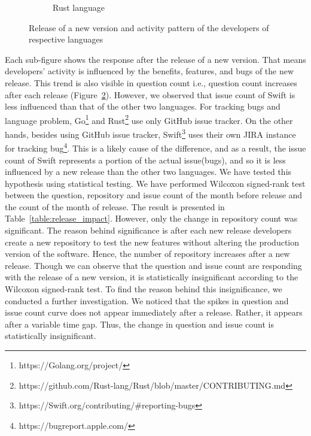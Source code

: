 \begin{figure}[h]
\begin{subfigure}{0.6\textwidth}
\caption{Rust language}
\label{fig:Question count for Rust}
\end{subfigure}
\caption{Release of a new version and activity pattern of the developers of respective languages}
\label{fig:Release and user behavior}
\end{figure}
Each sub-figure shows the response after the release of a new version. That means developers' activity is influenced by the benefits, features, and bugs of the new release. This trend is also visible  in question count i.e., question count increases after each release (Figure~\ref{fig:Release and user behavior}). However, we observed that issue count of Swift is less influenced than that of the other two languages. For tracking bugs and language problem,  Go\footnote{https://Golang.org/project/} and Rust\footnote{https://github.com/Rust-lang/Rust/blob/master/CONTRIBUTING.md} use only GitHub issue tracker. On the other hands, besides using GitHub issue tracker, Swift\footnote{https://Swift.org/contributing/\#reporting-bugs} uses their own JIRA\citep{wiki:JIRA} instance for tracking bug\footnote{https://bugreport.apple.com/}. This is a likely cause of the difference, and as a result, the issue count of Swift represents a portion of the actual issue(bugs), and so it is less influenced by a new release than the other two languages. We have tested this hypothesis using statistical testing. We have performed Wilcoxon signed-rank test between the question, repository and issue count of the month before release and the count of the month of release. The result is presented in Table~\ref{table:release_impact}. However, only the change in repository count was significant. The reason behind significance is after each new release developers create a new repository to test the new features without altering the production version of the software. Hence, the number of repository increases after a new release. Though we can observe that the question and issue count 
 are responding with the release of a new version, it is statistically insignificant according to the Wilcoxon signed-rank test. To find the reason behind this insignificance, we conducted a further investigation. We noticed that the spikes in question and issue count curve does not appear immediately after a release. Rather, it appears after a variable time gap. Thus, the change in question and issue count is statistically insignificant.


